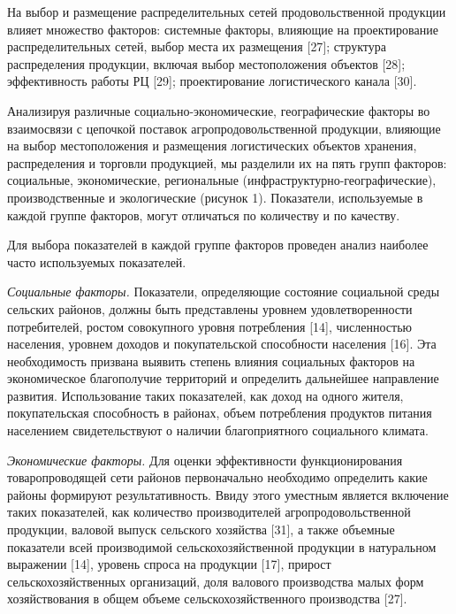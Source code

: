 \begin{multicols}{2}
На выбор и размещение распределительных сетей продовольственной
продукции влияет множество факторов: системные факторы, влияющие на
проектирование распределительных сетей, выбор места их размещения
{[}27{]}; структура распределения продукции, включая выбор
местоположения объектов {[}28{]}; эффективность работы РЦ {[}29{]};
проектирование логистического канала {[}30{]}.

Анализируя различные социально-экономические, географические факторы во
взаимосвязи с цепочкой поставок агропродовольственной продукции,
влияющие на выбор местоположения и размещения логистических объектов
хранения, распределения и торговли продукцией, мы разделили их на пять
групп факторов: социальные, экономические, региональные
(инфраструктурно-географические), производственные и экологические
(рисунок 1). Показатели, используемые в каждой группе факторов, могут
отличаться по количеству и по качеству.

Для выбора показателей в каждой группе факторов проведен анализ наиболее
часто используемых показателей.

\emph{Социальные факторы.} Показатели, определяющие состояние социальной
среды сельских районов, должны быть представлены уровнем
удовлетворенности потребителей, ростом совокупного уровня потребления
{[}14{]}, численностью населения, уровнем доходов и покупательской
способности населения {[}16{]}. Эта необходимость призвана выявить
степень влияния социальных факторов на экономическое благополучие
территорий и определить дальнейшее направление развития. Использование
таких показателей, как доход на одного жителя, покупательская
способность в районах, объем потребления продуктов питания населением
свидетельствуют о наличии благоприятного социального климата.

\emph{Экономические факторы.} Для оценки эффективности функционирования
товаропроводящей сети районов первоначально необходимо определить какие
районы формируют результативность. Ввиду этого уместным является
включение таких показателей, как количество производителей
агропродовольственной продукции, валовой выпуск сельского хозяйства
{[}31{]}, а также объемные показатели всей производимой
сельскохозяйственной продукции в натуральном выражении {[}14{]}, уровень
спроса на продукции {[}17{]}, прирост сельскохозяйственных организаций,
доля валового производства малых форм хозяйствования в общем объеме
сельскохозяйственного производства {[}27{]}.
\end{multicols}


